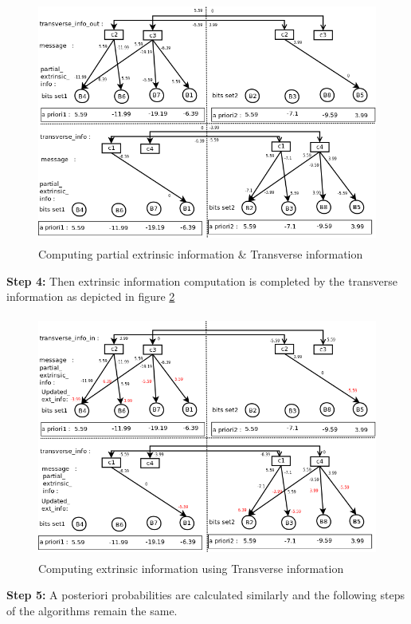 \begin{figure}[h!]
\centering
\includegraphics[height=8cm,width=12cm]{minSumModified3}
\caption[Computation of partial extrinsic information \& Transverse information ]{Computing partial extrinsic information \& Transverse information}
\label{minSumModified3}
\end{figure}

\textbf{Step 4:}
Then extrinsic information computation is completed by the transverse information as depicted in figure \ref{minSumModified4}
\begin{figure}[h!]
\centering
\includegraphics[height=8cm,width=12cm]{minSumModified4}
\caption[Computation of extrinsic information using Transverse information]{Computing extrinsic information using Transverse information}
\label{minSumModified4}
\end{figure}

\textbf{Step 5:}
A posteriori probabilities are  calculated similarly and the following steps of the algorithms remain the same. 

